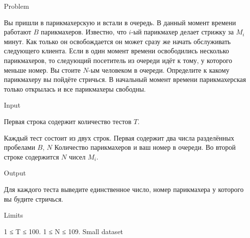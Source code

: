 Problem


Вы пришли в парикмахерскую и встали в очередь. В данный момент времени работают $B$ парикмахеров. Известно, что $i$-ый парикмахер делает стрижку 
за $M_i$ минут. Как только он освобождается он может сразу же начать обслуживать следующего клиента. Если в один момент времени освободились несколько  парикмахеров, то следующий посетитель из очереди идёт к тому, у которого меньше номер. 
Вы стоите $N$-ым человеком в очереди. Определите к какому парикмахеру вы пойдёте стричься.
В начальный момент времени парикмахерская только открылась и все парикмахеры свободны.





Input

Первая строка содержит количество тестов $T$. 

Каждый тест состоит из двух строк. Первая содержит два числа разделённых пробелами $B$, $N$
Количество парикмахеров и ваш номер в очереди. 
Во второй строке содержится $N$ чисел $M_i$.

Output

Для каждого теста выведите единственное число, номер парикмахера у которого вы будите стричься.


Limits

1 ≤ T ≤ 100.
1 ≤ N ≤ 109.
Small dataset


